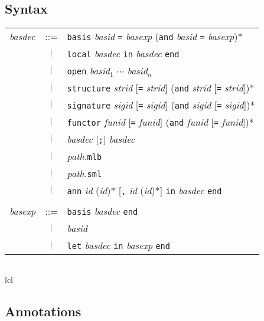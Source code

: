 %

%
\subsection{Syntax}

\begin{latexonly}
\begin{center}
\begin{tabular}{lcl}
{\it basdec} 
& ::=    & {\tt basis} {\it basid} {\tt =} {\it basexp}
            ({\tt and} {\it basid} {\tt =} {\it basexp})* \\
& $\ |\ $ & {\tt local} {\it basdec} {\tt in} {\it basdec} {\tt end} \\
& $\ |\ $ & {\tt open} {\it basid}$_1$ $\cdots$ {\it basid}$_n$ \\
& $\ |\ $ & {\tt structure} {\it strid} [{\tt =} {\it strid}] 
                ({\tt and} {\it strid} [{\tt =} {\it strid}])* \\
& $\ |\ $ & {\tt signature} {\it sigid} [{\tt =} {\it sigid}] 
                ({\tt and} {\it sigid} [{\tt =} {\it sigid}])* \\
& $\ |\ $ &   {\tt functor} {\it funid} [{\tt =} {\it funid}] 
                ({\tt and} {\it funid} [{\tt =} {\it funid}])* \\
& $\ |\ $ & {\it basdec} [{\tt;}] {\it basdec} \\
& $\ |\ $ & {\it path.}{\tt mlb} \\
& $\ |\ $ & {\it path.}{\tt sml} \\
& $\ |\ $ & {\tt ann} {\it id} ({\it id})* [{\tt ,}  {\it id} ({\it id})*] 
           {\tt in} {\it basdec} {\tt end} \\
\\
{\it basexp}
& ::=    & {\tt basis} {\it basdec} {\tt end} \\
& $\ |\ $ & {\it basid} \\
& $\ |\ $ & {\tt let} {\it basdec} {\tt in} {\it basexp} {\tt end}
\end{tabular}
\end{center}
\end{latexonly}
\begin{htmlonly}
\begin{center}
\begin{tabular}{lcl}
\end{tabular}{lcl}
\end{center}
\end{htmlonly}


%
\subsection{Annotations}


